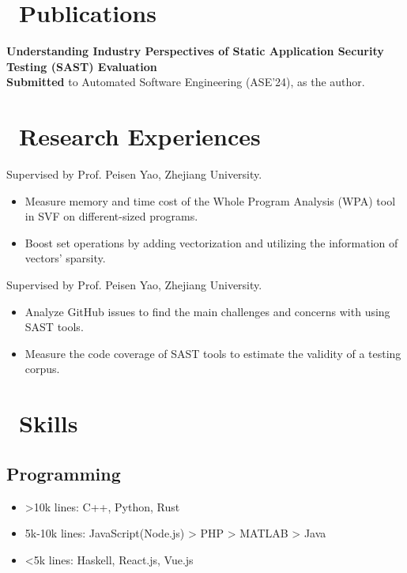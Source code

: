 \documentclass{resume}
\begin{document}
\section{\faBookmarkO\ Publications}
\textbf{Understanding Industry Perspectives of Static Application Security Testing (SAST) Evaluation}\\
\textbf{Submitted} to Automated Software Engineering (ASE'24), as the  author.

\section{\faSearch\ Research Experiences}
Supervised by Prof. Peisen Yao, Zhejiang University.
\begin{itemize}
  \item Measure memory and time cost of the Whole Program Analysis (WPA) tool in SVF on different-sized programs.
  \item Boost set operations by adding vectorization and utilizing the information of vectors' sparsity.
\end{itemize}

Supervised by Prof. Peisen Yao, Zhejiang University.
\begin{itemize}
  \item Analyze GitHub issues to find the main challenges and concerns with using SAST tools.
  \item Measure the code coverage of SAST tools to estimate the validity of a testing corpus.
\end{itemize}

\section{\faCogs\ Skills}
\subsection{Programming}
\begin{itemize}[parsep=0.5ex]
  \item >10k lines: C++, Python, Rust
  \item 5k-10k lines: JavaScript(Node.js) > PHP > MATLAB > Java
  \item <5k lines: Haskell, React.js, Vue.js
\end{itemize}
\end{document}
